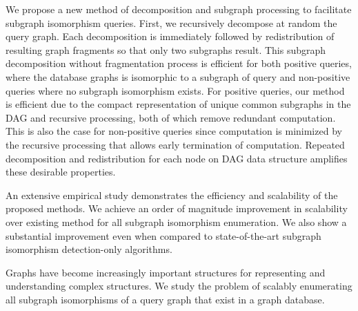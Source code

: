 We propose a new method of decomposition and subgraph processing to facilitate subgraph isomorphism queries. First, we recursively decompose at random  the query graph. Each decomposition is immediately followed by redistribution of resulting graph fragments so that only two subgraphs result. This subgraph decomposition without fragmentation process is efficient for both positive queries, where the database graphs is isomorphic to a subgraph of query and non-positive queries where no subgraph isomorphism exists. For positive queries, our method is efficient due to the compact representation of unique common subgraphs in the DAG  and recursive processing, both of which remove redundant computation. This is also the case for non-positive queries since computation is minimized by the recursive processing that allows early termination of computation. Repeated decomposition and redistribution for each node on DAG data structure amplifies these desirable properties. 


An extensive empirical study demonstrates the efficiency and scalability of the proposed methods. We achieve  an order of magnitude improvement in scalability over existing method for all subgraph isomorphism enumeration.
We also show a substantial improvement even when compared to state-of-the-art subgraph isomorphism detection-only algorithms. 




Graphs have become increasingly important structures for representing and understanding complex structures.
We study the problem of scalably enumerating all subgraph isomorphisms of a query graph that exist in a graph database.

